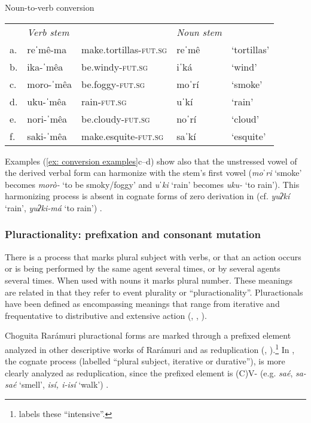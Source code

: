\ea\label{ex: conversion examples}
{Noun-to-verb conversion}

\begin{tabular}{lllll}
 & \textit{Verb stem} & & \textit{Noun stem}\\
     a. & reˈmê-ma & {make.tortillas-\textsc{fut.sg}} & {reˈmê} & {‘tortillas’}\\
     b. & {ika-ˈmêa} & {be.windy-\textsc{fut.sg}} & {iˈká} & {`wind'}\\
     c. & {moro-ˈmêa} & {be.foggy-\textsc{fut.sg}} & {moˈrí} & {`smoke'}\\
     d. & {uku-ˈmêa} & {rain-\textsc{fut.sg}} & {uˈkí} & {‘rain’}\\
     e. & {nori-ˈmêa} & {be.cloudy-\textsc{fut.sg}} & {noˈrí} & {`cloud'}\\
     f. & {saki-ˈmêa}&{make.esquite-\textsc{fut.sg}}&{saˈkí}&{‘esquite’}\\
\end{tabular}
\z

Examples (\ref{ex: conversion examples}c--d) show also that the unstressed vowel of the derived verbal form can harmonize with the stem’s first vowel (\textit{moˈri} ‘smoke’ becomes \textit{morò-} ‘to be smoky/foggy’ and \textit{uˈki} ‘rain’ becomes \textit{uku-} ‘to rain’). This harmonizing process is absent in cognate forms of zero derivation in  (cf. \textit{yuʔkí} ‘rain’, \textit{yuʔki-má} ‘to rain’) \citep[][148]{miller1996guarijio}.


\subsubsection{Pluractionality: prefixation and consonant mutation}
\label{subsubsec: pluractionality}

There is a process that marks plural subject with verbs, or that an action occurs or is being performed by the same agent several times, or by several agents several times. When used with nouns it marks plural number. These meanings are related in that they refer to event plurality or ``pluractionality''. Pluractionals have been defined as encompassing meanings that range from iterative and frequentative to distributive and extensive action (\citealt{newman1990nominal}, \citealt{newman2012pluractional}, \citealt{wood2007semantic}).

Choguita Rarámuri pluractional forms are marked through a prefixed element analyzed in other descriptive works of Rarámuri and  as reduplication (\citealt{lionnet1968intensivos}, \citealt{lionnet1985lionnet}).\footnote{\citet{lionnet2001elementos} labels these ``intensive''.} In , the cognate process (labelled ``plural subject, iterative or durative''), is more clearly analyzed as reduplication, since the prefixed element is (C)V- (e.g. \textit{saé}, \textit{sa-saé} ‘smell’, \textit{isí, i-isí} ‘walk’) \citep[][62]{miller1996guarijio}.

